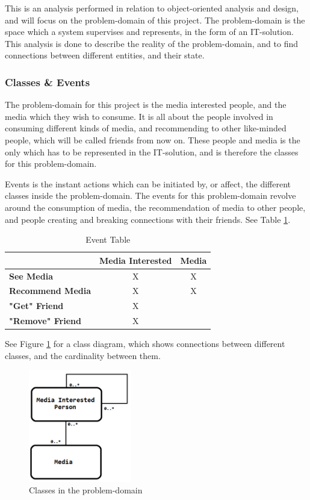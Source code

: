 This is an analysis performed in relation to object-oriented analysis and design, and will focus on the problem-domain of this project. The problem-domain is the space which a system supervises and represents, in the form of an IT-solution. This analysis is done to describe the reality of the problem-domain, and to find connections between different entities, and their state.

\subsubsection{Classes \& Events}

The problem-domain for this project is  the media interested people, and the media which they wish to consume. It is all about the people involved in consuming different kinds of media, and recommending to other like-minded people, which will be called friends from now on. These people and media is the only which has to be represented in the IT-solution, and is therefore the classes for this problem-domain.

Events is the instant actions which can be initiated by, or affect, the different classes inside the problem-domain. The events for this problem-domain revolve around the consumption of media, the recommendation of media to other people, and people creating and breaking connections with their friends. See Table \ref{EventTable}.

\begin{table}[htb]
\centering
\begin{tabular}{|l|c|c|} \hline
	  & \textbf{Media Interested} & \textbf{Media} \\ \hline
	\textbf{See Media} & X & X \\ \hline
	\textbf{Recommend Media} & X & X \\ \hline
	\textbf{"Get" Friend} & X &  \\ \hline
	\textbf{"Remove" Friend} & X &  \\ \hline
\end{tabular}
\caption{Event Table}
\label{EventTable}
\end{table}

See Figure \ref{ClassDiagram} for a class diagram, which shows connections between different classes, and the cardinality between them.

\begin{figure}[htb]
\centering
\includegraphics[width=0.4\textwidth]{Images/classdiagram.png}
\caption{Classes in the problem-domain}
\label{ClassDiagram}
\end{figure}


